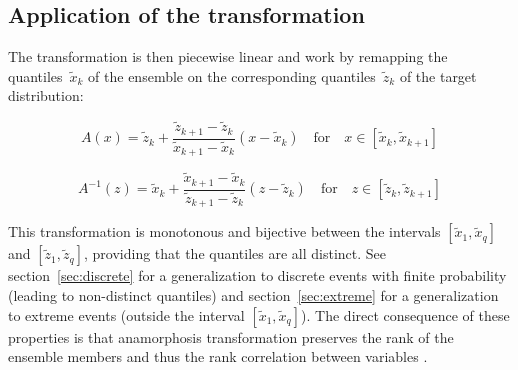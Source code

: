 \documentclass[11pt]{article}
\begin{document}
\subsection{Application of the transformation}

The transformation is then piecewise linear and work by remapping the quantiles~$\tilde{x}_k$
of the ensemble on the corresponding quantiles~$\tilde{z}_k$ of the target distribution:

\begin{equation}
\label{eq:anaforward}
A(x) = \tilde{z}_k + \frac{\tilde{z}_{k+1}-\tilde{z}_k}{\tilde{x}_{k+1}-\tilde{x}_k} (x-\tilde{x}_k)
\quad\mbox{for}\quad
x \in [\tilde{x}_k,\tilde{x}_{k+1}]
\end{equation}

\begin{equation}
\label{eq:backforward}
A^{-1}(z) = \tilde{x}_k + \frac{\tilde{x}_{k+1}-\tilde{x}_k}{\tilde{z}_{k+1}-\tilde{z}_k} (z-\tilde{z}_k)
\quad\mbox{for}\quad
z \in [\tilde{z}_k,\tilde{z}_{k+1}]
\end{equation}

\noindent
This transformation is monotonous and bijective between the intervals
$[\tilde{x}_1,\tilde{x}_q]$ and $[\tilde{z}_1,\tilde{z}_q]$,
providing that the quantiles are all distinct.
See section~\ref{sec:discrete} for a generalization to discrete events with finite probability
(leading to non-distinct quantiles) and
section~\ref{sec:extreme} for a generalization to extreme events
(outside the interval $[\tilde{x}_1,\tilde{x}_q]$).
The direct consequence of these properties is that anamorphosis transformation
preserves the rank of the ensemble members and thus the rank correlation between variables
\citep[see][for more details about the effect of the transformation on correlations]{BRAN12}.
\end{document}
